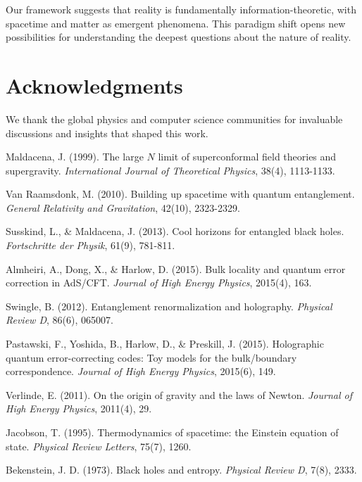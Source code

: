 \documentclass[12pt]{article}
\begin{document}
Our framework suggests that reality is fundamentally information-theoretic, with spacetime and matter as emergent phenomena. This paradigm shift opens new possibilities for understanding the deepest questions about the nature of reality.

\section*{Acknowledgments}

We thank the global physics and computer science communities for invaluable discussions and insights that shaped this work.

\begin{thebibliography}{99}

Maldacena, J. (1999). 
The large $N$ limit of superconformal field theories and supergravity. 
\emph{International Journal of Theoretical Physics}, 38(4), 1113-1133.

Van Raamsdonk, M. (2010). 
Building up spacetime with quantum entanglement. 
\emph{General Relativity and Gravitation}, 42(10), 2323-2329.

Susskind, L., \& Maldacena, J. (2013). 
Cool horizons for entangled black holes. 
\emph{Fortschritte der Physik}, 61(9), 781-811.

Almheiri, A., Dong, X., \& Harlow, D. (2015). 
Bulk locality and quantum error correction in AdS/CFT. 
\emph{Journal of High Energy Physics}, 2015(4), 163.

Swingle, B. (2012). 
Entanglement renormalization and holography. 
\emph{Physical Review D}, 86(6), 065007.

Pastawski, F., Yoshida, B., Harlow, D., \& Preskill, J. (2015). 
Holographic quantum error-correcting codes: Toy models for the bulk/boundary correspondence. 
\emph{Journal of High Energy Physics}, 2015(6), 149.

Verlinde, E. (2011). 
On the origin of gravity and the laws of Newton. 
\emph{Journal of High Energy Physics}, 2011(4), 29.

Jacobson, T. (1995). 
Thermodynamics of spacetime: the Einstein equation of state. 
\emph{Physical Review Letters}, 75(7), 1260.

Bekenstein, J. D. (1973). 
Black holes and entropy. 
\emph{Physical Review D}, 7(8), 2333.


\end{thebibliography}
\end{document}
